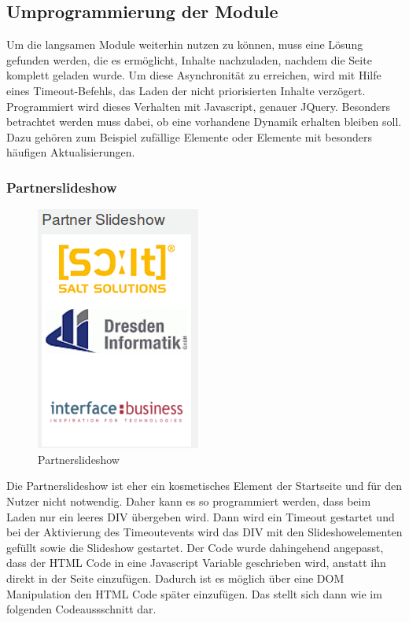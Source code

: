 \subsection{Umprogrammierung der Module}
Um die langsamen Module weiterhin nutzen zu können, muss eine Lösung gefunden werden, die es ermöglicht, Inhalte nachzuladen, nachdem die Seite komplett geladen wurde. Um diese Asynchronität zu erreichen, wird mit Hilfe eines Timeout-Befehls, das Laden der nicht priorisierten Inhalte verzögert. Programmiert wird dieses Verhalten mit Javascript, genauer JQuery. Besonders betrachtet werden muss dabei, ob eine vorhandene Dynamik erhalten bleiben soll. Dazu gehören zum Beispiel zufällige Elemente oder Elemente mit besonders häufigen Aktualisierungen.

\subsubsection{Partnerslideshow}
\begin{figure}[!ht]
  \centering
  \includegraphics[scale=0.5]{material/partner_slideshow.png}
  \caption{Partnerslideshow}
  \label{fig:partnerslideshow}
\end{figure} 

Die Partnerslideshow ist eher ein kosmetisches Element der Startseite und für den Nutzer nicht notwendig. Daher kann es so programmiert werden, dass beim Laden nur ein leeres DIV übergeben wird. Dann wird ein Timeout gestartet und bei der Aktivierung des Timeoutevents wird das DIV mit den Slideshowelementen gefüllt sowie die Slideshow gestartet. Der Code wurde dahingehend angepasst, dass der HTML Code in eine Javascript Variable geschrieben wird, anstatt ihn direkt in der Seite einzufügen. Dadurch ist es möglich über eine DOM Manipulation den HTML Code später einzufügen. Das stellt sich dann wie im folgenden Codeaussschnitt dar.

